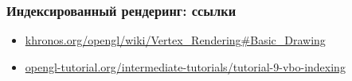 \documentclass{beamer}
\begin{document}
\begin{frame}[fragile]
\frametitle{Индексированный рендеринг: ссылки}
\fontsize{10pt}{10pt}
\begin{itemize}
\item \href{https://www.khronos.org/opengl/wiki/Vertex_Rendering#Basic_Drawing}{khronos.org/opengl/wiki/Vertex\_Rendering\#Basic\_Drawing}
\item \href{http://www.opengl-tutorial.org/intermediate-tutorials/tutorial-9-vbo-indexing}{opengl-tutorial.org/intermediate-tutorials/tutorial-9-vbo-indexing}
\end{itemize}
\end{frame}
\end{document}
